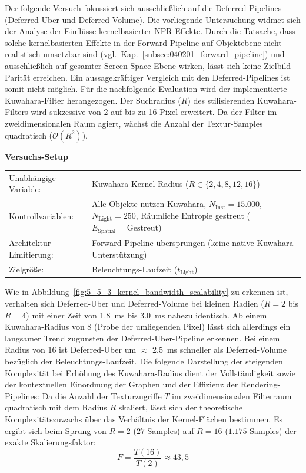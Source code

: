 Der folgende Versuch fokussiert sich ausschließlich auf die Deferred-Pipelines (Deferred-Uber und Deferred-Volume).
Die vorliegende Untersuchung widmet sich der Analyse der Einflüsse kernelbasierter \ac{NPR}-Effekte.
Durch die Tatsache, dass solche kernelbasierten Effekte in der Forward-Pipeline auf Objektebene nicht realistisch
umsetzbar sind (vgl.\ Kap.~\ref{subsec:040201_forward_pipeline}) und ausschließlich auf gesamter Screen-Space-Ebene
wirken, lässt sich keine Zielbild-Parität erreichen.
Ein aussagekräftiger Vergleich mit den Deferred-Pipelines ist somit nicht möglich.
Für die nachfolgende Evaluation wird der implementierte Kuwahara-Filter herangezogen.
Der Suchradius ($R$) des stilisierenden Kuwahara-Filters wird sukzessive von 2 auf bis zu 16 Pixel erweitert.
Da der Filter im zweidimensionalen Raum agiert, wächst die Anzahl der Textur-Samples quadratisch ($\mathcal{O}(R^2)$).

\begin{center}
    \small
    \colorbox{gray!5}{\parbox{0.95\textwidth}{
        \centering
        \vspace{2mm}
        {\sffamily\bfseries Versuchs-Setup} \\[1.5ex]
        \begin{tabularx}{0.9\textwidth}{>{\sffamily}l X}
            Unabhängige Variable:    & Kuwahara-Kernel-Radius ($R \in \{2, 4, 8, 12, 16\}$) \\
            Kontrollvariablen:       & Alle Objekte nutzen Kuwahara,
            $N_{\text{Inst}} = 15.000$, $N_{\text{Light}} = 250$,
            Räumliche Entropie gestreut ($E_{\text{Spatial}} = \text{Gestreut}$) \\
            Architektur-Limitierung: & Forward-Pipeline übersprungen (keine native Kuwahara-Unterstützung) \\
            Zielgröße:               & Beleuchtungs-Laufzeit ($t_{\text{Light}}$)
        \end{tabularx}
        \vspace{2mm}
    }}
\end{center}

Wie in Abbildung~\ref{fig:5_5_3_kernel_bandwidth_scalability} zu erkennen ist, verhalten sich Deferred-Uber
und Deferred-Volume bei kleinen Radien ($R = 2$ bis $R = 4$) mit einer Zeit von \qty{1,8}{\milli\second} bis
\qty{3,0}{\milli\second} nahezu identisch.
Ab einem Kuwahara-Radius von 8 (Probe der umliegenden Pixel) lässt sich allerdings ein langsamer Trend zugunsten der
Deferred-Uber-Pipeline erkennen.
Bei einem Radius von 16 ist Deferred-Uber um $\approx$ \qty{2,5}{\milli\second} schneller als
Deferred-Volume bezüglich der Beleuchtungs-Laufzeit.
Die folgende Darstellung der steigenden Komplexität bei Erhöhung des Kuwahara-Radius dient der Vollständigkeit sowie der
kontextuellen Einordnung der Graphen und der Effizienz der Rendering-Pipelines:
Da die Anzahl der Texturzugriffe $T$ im zweidimensionalen Filterraum quadratisch mit dem Radius $R$ skaliert, lässt sich
der theoretische Komplexitätszuwachs über das Verhältnis der Kernel-Flächen bestimmen.
Es ergibt sich beim Sprung von $R=2$ ($27$ Samples) auf $R=16$ ($1.175$ Samples) der exakte Skalierungsfaktor:
\[F = \frac{T(16)}{T(2)} \approx 43{,}5\]

